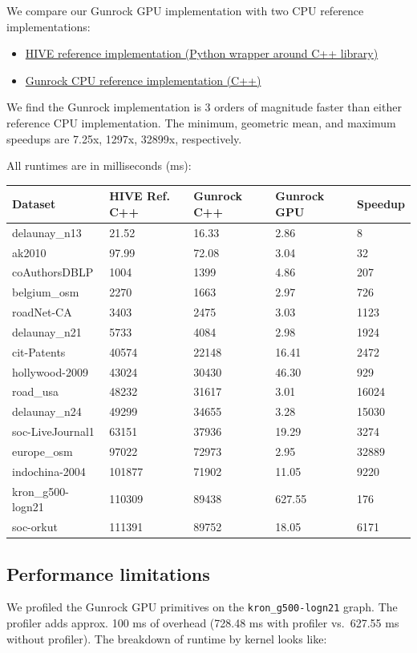 \documentclass[10pt,oneside]{memoir}
\providecommand{\tightlist}{%
  \setlength{\itemsep}{0pt}\setlength{\parskip}{0pt}}
\begin{document}
We compare our Gunrock GPU implementation with two CPU reference
implementations:

\begin{itemize}
\tightlist
\item
  \href{https://gitlab.hiveprogram.com/ggillary/local_graph_clustering_socialmedia}{HIVE
  reference implementation (Python wrapper around C++ library)}
\item
  \href{https://github.com/gunrock/gunrock/blob/dev-refactor/gunrock/app/pr_nibble/pr_nibble_test.cuh\#L38}{Gunrock
  CPU reference implementation (C++)}
\end{itemize}

We find the Gunrock implementation is 3 orders of magnitude faster than
either reference CPU implementation. The minimum, geometric mean, and
maximum speedups are 7.25x, 1297x, 32899x, respectively.

All runtimes are in milliseconds (ms):

\begin{longtable}[]{@{}lllll@{}}
\toprule
Dataset & HIVE Ref. C++ & Gunrock C++ & Gunrock GPU &
Speedup\tabularnewline
\midrule
\endhead
delaunay\_n13 & 21.52 & 16.33 & 2.86 & 8\tabularnewline
ak2010 & 97.99 & 72.08 & 3.04 & 32\tabularnewline
coAuthorsDBLP & 1004 & 1399 & 4.86 & 207\tabularnewline
belgium\_osm & 2270 & 1663 & 2.97 & 726\tabularnewline
roadNet-CA & 3403 & 2475 & 3.03 & 1123\tabularnewline
delaunay\_n21 & 5733 & 4084 & 2.98 & 1924\tabularnewline
cit-Patents & 40574 & 22148 & 16.41 & 2472\tabularnewline
hollywood-2009 & 43024 & 30430 & 46.30 & 929\tabularnewline
road\_usa & 48232 & 31617 & 3.01 & 16024\tabularnewline
delaunay\_n24 & 49299 & 34655 & 3.28 & 15030\tabularnewline
soc-LiveJournal1 & 63151 & 37936 & 19.29 & 3274\tabularnewline
europe\_osm & 97022 & 72973 & 2.95 & 32889\tabularnewline
indochina-2004 & 101877 & 71902 & 11.05 & 9220\tabularnewline
kron\_g500-logn21 & 110309 & 89438 & 627.55 & 176\tabularnewline
soc-orkut & 111391 & 89752 & 18.05 & 6171\tabularnewline
\bottomrule
\end{longtable}

\hypertarget{performance-limitations-5}{%
\subsection{Performance limitations}\label{performance-limitations-5}}

We profiled the Gunrock GPU primitives on the \texttt{kron\_g500-logn21}
graph. The profiler adds approx. 100 ms of overhead (728.48 ms with
profiler vs.~627.55 ms without profiler). The breakdown of runtime by
kernel looks like:
\end{document}
